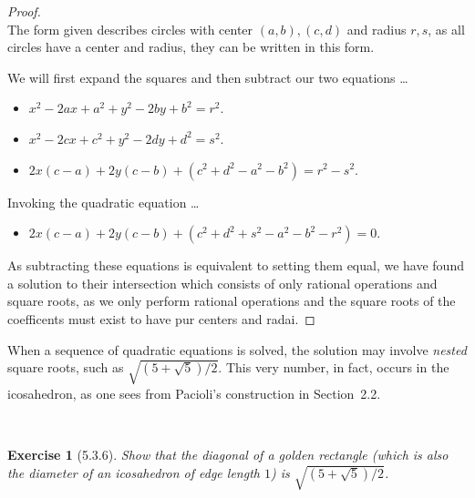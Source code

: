 \documentclass[12pt]{article}
\newcommand{\XB}{\color{black}}
\newcommand{\XBB}{\color{blue}}
\newcommand{\ds}{\displaystyle}
\theoremstyle{plain}
\newtheorem{ex}{Exercise}
\begin{document}
\begin{proof}
  \ \\

  The form given describes circles with center $ (a, b), (c, d) $ and radius $ r, s $, as all circles have a center and radius, they can be written in this form.

  We will first expand the squares and then subtract our two equations \dots

  \begin{itemize}
    \item $ \ds x^{2} - 2ax + a^{2} + y^{2} - 2by + b^{2} = r^{2} $.
    \item $ \ds x^{2} - 2cx + c^{2} + y^{2} - 2dy + d^{2} = s^{2} $.
    \item $ \ds 2x(c - a) + 2y(c - b) + (c^{2} + d^{2} - a^{2} - b^{2}) = r^{2} - s^{2} $.
  \end{itemize}

  Invoking the quadratic equation \dots

  \begin{itemize}
    \item $ \ds 2x(c - a) + 2y(c - b) + (c^{2} + d^{2} + s^{2} - a^{2} - b^{2} - r^{2}) = 0 $.
  \end{itemize}

  As subtracting these equations is equivalent to setting them equal, we have found a solution to their intersection which consists of only rational operations and square roots, 
  as we only perform rational operations and the square roots of the coefficents must exist to have pur centers and radai. 

\end{proof}

\newpage

When a sequence of quadratic equations is solved, the solution may involve \emph{nested} square roots, such as $ \sqrt{(5 + \sqrt{5}) / 2} $. This very number, in fact, occurs in the icosahedron, as one sees from Pacioli's construction in Section~2.2.

\XBB\hrulefill\XB \\
\begin{ex} [5.3.6]
  Show that the diagonal of a golden rectangle (which is also the diameter of an icosahedron of edge length $ 1 $) is $ \sqrt{(5 + \sqrt{5}) / 2} $.
\end{ex}
\XBB\hrulefill\XB \\
\end{document}
